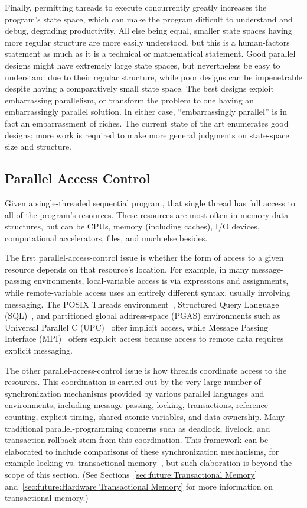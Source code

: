 Finally, permitting threads to execute concurrently greatly increases
the program's state space, which can make the program difficult to
understand and debug, degrading productivity.
All else being equal, smaller state spaces having more regular structure
are more easily understood, but this is a human-factors statement as much
as it is a technical or mathematical statement.
Good parallel designs might have extremely large state spaces, but
nevertheless be easy to understand due to their regular structure,
while poor designs can be impenetrable despite having a comparatively
small state space.
The best designs exploit embarrassing parallelism, or transform the
problem to one having an embarrassingly parallel solution.
In either case, ``embarrassingly parallel'' is in fact
an embarrassment of riches.
The current state of the art enumerates good designs; more work is
required to make more general judgments on
state-space size and structure.

\subsection{Parallel Access Control}
\label{sec:Parallel Access Control}

Given a single-threaded sequential program, that single
thread has full access to all of the program's resources.
These resources are most often in-memory data structures, but can be CPUs,
memory (including caches), I/O devices, computational accelerators, files,
and much else besides.

The first parallel-access-control issue is whether the form of access to
a given resource depends on that resource's location.
For example, in many message-passing environments, local-variable
access is via expressions and assignments,
while remote-variable access uses an entirely different
syntax, usually involving messaging.
The POSIX Threads environment~\cite{OpenGroup1997pthreads},
Structured Query Language (SQL)~\cite{DIS9075SQL92}, and
partitioned global address-space (PGAS) environments
such as Universal Parallel C (UPC)~\cite{ElGhazawi2003UPC,UPCConsortium2013}
offer implicit access,
while Message Passing Interface (MPI)~\cite{MPIForum2008} offers
explicit access because access to remote data requires explicit
messaging.

The other parallel-access-control issue is how threads coordinate
access to the resources.
This coordination is carried out by
the very large number of synchronization mechanisms
provided by various parallel languages and environments,
including message passing, locking, transactions,
reference counting, explicit timing, shared atomic variables, and data
ownership.
Many traditional parallel-programming concerns such as deadlock,
livelock, and transaction rollback stem from this coordination.
This framework can be elaborated to include comparisons
of these synchronization mechanisms, for example locking vs. transactional
memory~\cite{McKenney2007PLOSTM}, but such elaboration is beyond the
scope of this section.
(See
Sections~\ref{sec:future:Transactional Memory}
and~\ref{sec:future:Hardware Transactional Memory}
for more information on transactional memory.)

